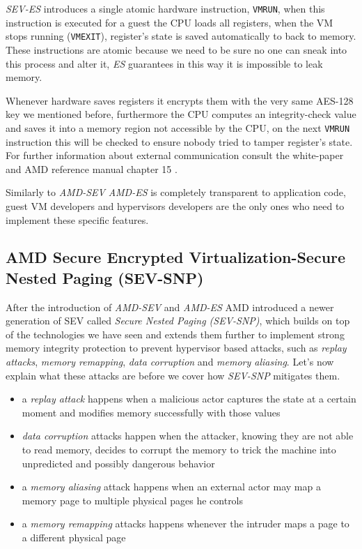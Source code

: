 \documentclass[twocolumn]{article}
\begin{document}
\textit{SEV-ES} introduces a single atomic hardware instruction, \texttt{VMRUN}, when this instruction is executed for a guest the CPU loads all registers, when the VM stops running (\texttt{VMEXIT}), register's state is saved automatically to  back to memory. These instructions are atomic because we need to be sure no one can sneak into this process and alter it, \textit{ES} guarantees in this way it is impossible to leak memory.

Whenever hardware saves registers it encrypts them with the very same AES-128 key we mentioned before, furthermore the CPU computes an integrity-check value and saves it into a memory region not accessible by the CPU, on the next \texttt{VMRUN} instruction this will be checked to ensure nobody tried to tamper register's state. For further information about external communication consult the white-paper \cite{protecting-registers} and AMD reference manual chapter 15 \cite{architecture-reference}.

Similarly to \textit{AMD-SEV} \textit{AMD-ES} is completely transparent to application code, guest VM developers and hypervisors developers are the only ones who  need to implement these specific features.

\subsection{AMD Secure Encrypted Virtualization-Secure Nested Paging (SEV-SNP)}

After the introduction of \textit{AMD-SEV} and \textit{AMD-ES} AMD introduced a newer generation of SEV called \textit{Secure Nested Paging (SEV-SNP)}, which builds on top of the technologies we have seen and extends them further to implement strong memory integrity protection to prevent hypervisor based attacks, such as \textit{replay attacks}, \textit{memory remapping}, \textit{data corruption} and \textit{memory aliasing}.
Let's now explain what these attacks are before we cover how \textit{SEV-SNP} mitigates them.

\begin{itemize}
    \item a \textit{replay attack} happens when a malicious actor captures the state at a certain moment and modifies memory successfully with those values
    \item \textit{data corruption} attacks happen when the attacker, knowing they are not able to read memory, decides to corrupt the memory to trick the machine into unpredicted and possibly dangerous behavior
    \item a \textit{memory aliasing} attack happens when an external actor may map a memory page to multiple physical pages he controls
    \item a \textit{memory remapping} attacks happens whenever the intruder maps a page to a different physical page
\end{itemize}
\end{document}
